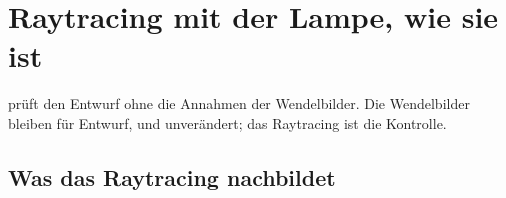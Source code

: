 \section{Raytracing mit der Lampe, wie sie ist}\label{sec:al-raytracing}

 prüft den Entwurf ohne die Annahmen der Wendelbilder. Die
Wendelbilder bleiben für Entwurf,  und  unverändert;
das Raytracing ist die Kontrolle.

\subsection{Was das Raytracing nachbildet}

